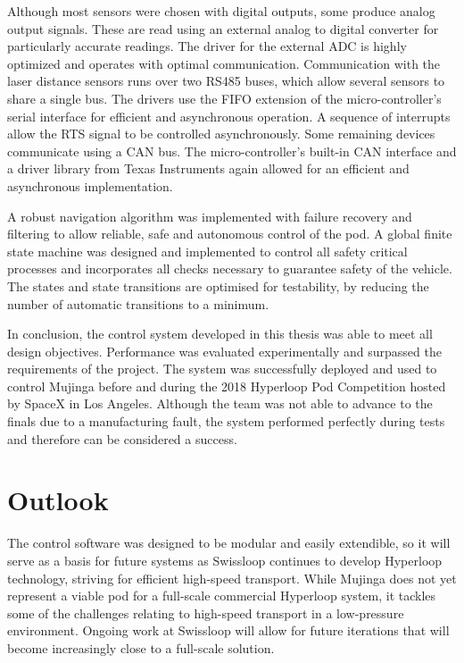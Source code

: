 
Although most sensors were chosen with digital outputs, some produce analog output signals. These are read using an external analog to digital converter for particularly accurate readings. The driver for the external ADC is highly optimized and operates with optimal communication. Communication with the laser distance sensors runs over two RS485 buses, which allow several sensors to share a single bus. The drivers use the FIFO extension of the micro-controller's serial interface for efficient and asynchronous operation. A sequence of interrupts allow the RTS signal to be controlled asynchronously. Some remaining devices communicate using a CAN bus. The micro-controller's built-in CAN interface and a driver library from Texas Instruments again allowed for an efficient and asynchronous implementation.


A robust navigation algorithm was implemented with failure recovery and filtering to allow reliable, safe and autonomous control of the pod. A global finite state machine was designed and implemented to control all safety critical processes and incorporates all checks necessary to guarantee safety of the vehicle. The states and state transitions are optimised for testability, by reducing the number of automatic transitions to a minimum.


In conclusion, the control system developed in this thesis was able to meet all design objectives. Performance was evaluated experimentally and surpassed the requirements of the project. The system was successfully deployed and used to control Mujinga before and during the 2018 Hyperloop Pod Competition hosted by SpaceX in Los Angeles. Although the team was not able to advance to the finals due to a manufacturing fault, the system performed perfectly during tests and therefore can be considered a success.

\section{Outlook}

The control software was designed to be modular and easily extendible, so it will serve as a basis for future systems as Swissloop continues to develop Hyperloop technology, striving for efficient high-speed transport. While Mujinga does not yet represent a viable pod for a full-scale commercial Hyperloop system, it tackles some of the challenges relating to high-speed transport in a low-pressure environment. Ongoing work at Swissloop will allow for future iterations that will become increasingly close to a full-scale solution.
